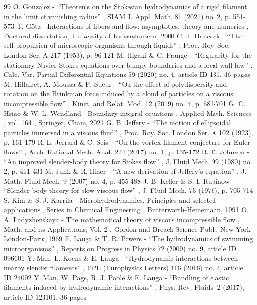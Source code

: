 \begin{thebibliography}{99}
 O. Gonzalez - “Theorems on the Stokesian hydrodynamics of a rigid filament in the limit of vanishing radius” , SIAM J. Appl. Math. 81 (2021) no. 2, p. 551-573
 T. Götz - Interactions of fibers and flow: asymptotics, theory and numerics , Doctoral dissertation, University of Kaiserslautern, 2000
 G. J. Hancock - “The self-propulsion of microscopic organisms through liquids” , Proc. Roy. Soc. London Ser. A 217 (1953), p. 96-121
 M. Higaki \& C. Prange - “Regularity for the stationary Navier-Stokes equations over bumpy boundaries and a local wall law” , Calc. Var. Partial Differential Equations 59 (2020) no. 4, article ID 131, 46 pages
 M. Hillairet, A. Moussa \& F. Sueur - “On the effect of polydispersity and rotation on the Brinkman force induced by a cloud of particles on a viscous incompressible flow” , Kinet. and Relat. Mod. 12 (2019) no. 4, p. 681-701
 G. C. Hsiao \& W. L. Wendland - Boundary integral equations , Applied Math. Sciences , vol. 164 , Springer, Cham, 2021
 G. B. Jeffery - “The motion of ellipsoidal particles immersed in a viscous fluid” , Proc. Roy. Soc. London Ser. A 102 (1923), p. 161-179
 R. L. Jerrard \& C. Seis - “On the vortex filament conjecture for Euler flows” , Arch. Rational Mech. Anal. 224 (2017) no. 1, p. 135-172
 R. E. Johnson - “An improved slender-body theory for Stokes flow” , J. Fluid Mech. 99 (1980) no. 2, p. 411-431
 M. Junk \& R. Illner - “A new derivation of Jeffery’s equation” , J. Math. Fluid Mech. 9 (2007) no. 4, p. 455-488
 J. B. Keller \& S. I. Rubinow - “Slender-body theory for slow viscous flow” , J. Fluid Mech. 75 (1976), p. 705-714
 S. Kim \& S. J. Karrila - Microhydrodynamics. Principles and selected applications , Series in Chemical Engineering , Butterworth-Heinemann, 1991
 O. A. Ladyzhenskaya - The mathematical theory of viscous incompressible flow , Math. and its Applications, Vol. 2 , Gordon and Breach Science Publ., New York-London-Paris, 1969
 E. Lauga \& T. R. Powers - “The hydrodynamics of swimming microorganisms” , Reports on Progress in Physics 72 (2009) no. 9, article ID 096601
 Y. Man, L. Koens \& E. Lauga - “Hydrodynamic interactions between nearby slender filaments” , EPL (Europhysics Letters) 116 (2016) no. 2, article ID 24002
 Y. Man, W. Page, R. J. Poole \& E. Lauga - “Bundling of elastic filaments induced by hydrodynamic interactions” , Phys. Rev. Fluids. 2 (2017), article ID 123101, 36 pages

\end{thebibliography}
